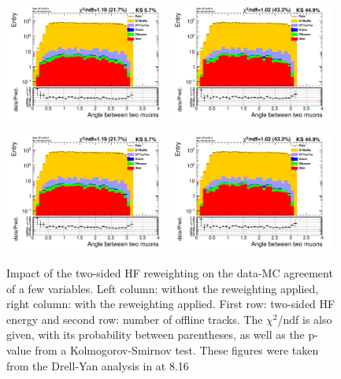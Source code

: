 \begin{figure}
 \begin{center}
  \includegraphics[width=0.48\textwidth,page=28]{Figures/WBoson/Analysis/EventSelection/dataMC_Powheg_MomUnCor_norew}\hfill
  \includegraphics[width=0.48\textwidth,page=28]{Figures/WBoson/Analysis/EventSelection/dataMC_Powheg_MomUnCor_rewboth}
  
  \includegraphics[width=0.48\textwidth,page=32]{Figures/WBoson/Analysis/EventSelection/dataMC_Powheg_MomUnCor_norew}\hfill
  \includegraphics[width=0.48\textwidth,page=32]{Figures/WBoson/Analysis/EventSelection/dataMC_Powheg_MomUnCor_rewboth}
 \end{center}
\caption{Impact of the two-sided HF reweighting on the data-MC agreement of a few variables. Left column: without the reweighting applied, right column: with the reweighting applied.
First row: two-sided HF energy and second row: number of offline tracks. The $\chi^2$/ndf is also given, with its probability between parentheses,
as well as the p-value from a Kolmogorov-Smirnov test. These figures were taken from the Drell-Yan analysis in \pPb at 8.16~\TeV \cite{DY_pPb}}
\label{fig:hfrew_1}
\end{figure}


